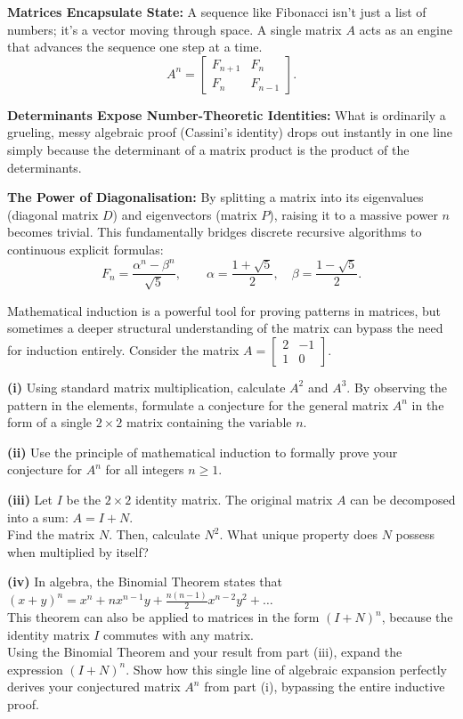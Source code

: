 \begin{takeaways}
\item \textbf{Matrices Encapsulate State:} A sequence like Fibonacci isn't just a list of numbers; it's a vector moving through space. A single matrix $A$ acts as an engine that advances the sequence one step at a time.
\[
A^n=
\begin{bmatrix}
F_{n+1}&F_n\\
F_n&F_{n-1}
\end{bmatrix}.
\]
\item \textbf{Determinants Expose Number-Theoretic Identities:} What is ordinarily a grueling, messy algebraic proof (Cassini's identity) drops out instantly in one line simply because the determinant of a matrix product is the product of the determinants.
\item \textbf{The Power of Diagonalisation:} By splitting a matrix into its eigenvalues (diagonal matrix $D$) and eigenvectors (matrix $P$), raising it to a massive power $n$ becomes trivial. This fundamentally bridges discrete recursive algorithms to continuous explicit formulas:
\[
F_n=\frac{\alpha^n-\beta^n}{\sqrt5},
\qquad
\alpha=\frac{1+\sqrt5}{2},\quad
\beta=\frac{1-\sqrt5}{2}.
\]
\end{takeaways}

\begin{problem}
Mathematical induction is a powerful tool for proving patterns in matrices, but sometimes a deeper structural understanding of the matrix can bypass the need for induction entirely. Consider the matrix $A = \begin{bmatrix} 2 & -1 \\ 1 & 0 \end{bmatrix}$.

\textbf{(i)} Using standard matrix multiplication, calculate $A^2$ and $A^3$. By observing the pattern in the elements, formulate a conjecture for the general matrix $A^n$ in the form of a single $2 \times 2$ matrix containing the variable $n$.

\textbf{(ii)} Use the principle of mathematical induction to formally prove your conjecture for $A^n$ for all integers $n \ge 1$.

\textbf{(iii)} Let $I$ be the $2 \times 2$ identity matrix. The original matrix $A$ can be decomposed into a sum: $A = I + N$. \\
Find the matrix $N$. Then, calculate $N^2$. What unique property does $N$ possess when multiplied by itself?

\textbf{(iv)} In algebra, the Binomial Theorem states that $(x+y)^n = x^n + nx^{n-1}y + \frac{n(n-1)}{2}x^{n-2}y^2 + \dots$ \\
This theorem can also be applied to matrices in the form $(I+N)^n$, because the identity matrix $I$ commutes with any matrix.\\
Using the Binomial Theorem and your result from part (iii), expand the expression $(I+N)^n$. Show how this single line of algebraic expansion perfectly derives your conjectured matrix $A^n$ from part (i), bypassing the entire inductive proof.
\end{problem}


